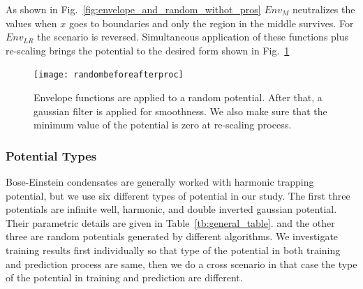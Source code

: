 \documentclass[a4paper,times,hidelinks,12pt]{article}
\begin{document}
As shown in Fig.~\ref{fig:envelope_and_random_withot_pros} $Env_{M}$ neutralizes the values when $x$ goes to boundaries and only the region in the middle survives. For $Env_{LR}$ the scenario is reversed. Simultaneous application of these functions plus re-scaling brings the potential to the desired form shown in Fig.~\ref{fig:random_plus_envelope}


\graphicspath{{"../figs/potentials/"}}
\begin{figure}[H]
    \texttt{[image: randombeforeafterproc]}
\caption{Envelope functions are applied to a random potential. After that, a gaussian filter is applied for smoothness. We also make sure that the minimum value of the potential is zero at re-scaling process.}
\label{fig:random_plus_envelope}
\end{figure}





\subsubsection{Potential Types}

Bose-Einstein condensates are generally worked with harmonic trapping potential, but we use six different types of potential in our study. The first three potentials are infinite well, harmonic, and double inverted gaussian potential. Their parametric details are given in Table~\ref{tb:general_table}. and the other three are random potentials generated by different algorithms. We investigate training results first individually so that type of the potential in both training and prediction process are same, then we do a cross scenario in that case the type of the potential in training and prediction are different.

\newcommand{\infinitewell}{$
V(x) = 
    \begin{cases}
       0 &\quad\text{if } x_l < x < x_r  \\
       \infty &\quad\text{if } \textit{otherwise} \\
    \end{cases}
$}

\newcommand{\harmonicpot}{$ V(x) =  \frac{1}{2}m \omega^2 (x - x_0) ^2 $}
\newcommand{\gaussianpot}{$V(x) = -A_1 \exp(\frac{(x - \mu_1)^2}{\sigma_1^2}) -A_2 \exp(\frac{(x - \mu_2)^2}{\sigma_2^2})$}
\newcommand{\randomexplation}{Damping high frequencies in Fourier space, and inverse transformation}
\newcommand{\envelopepotLR}{$\text{Env}_{LR}(x) = [(1 + \tanh{(\beta(x + x_L))}) + (1 - \tanh{(\beta(x + x_R))})]/2$}
\newcommand{\envelopepotM}{$\text{Env}_{M}(x) = 1 - \text{Env}_{LR}(x)$}
\newcommand{\randompotONE}{$V(x_{i+1}) = V(x_i) + [X\sim\mathcal{N}(\mu, \sigma)$]}
\end{document}

